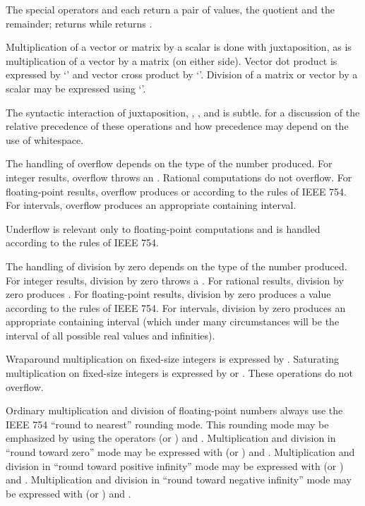 The special operators  and  each return a pair of values,
the quotient and the remainder;  returns
 while
 returns
.

Multiplication of a vector or matrix by a scalar is done with juxtaposition,
as is multiplication of a vector by a matrix (on either side).  Vector dot product
is expressed by `\EXP{\cdot}' and vector cross product by
`\EXP{\times}'.  Division of
a matrix or vector by a scalar may be expressed using `\EXP{/}'.

The syntactic interaction of juxtaposition, \EXP{\cdot}, \EXP{\times},
and \EXP{/} is subtle.
 for a discussion of the relative precedence of
these operations and how precedence may depend on the use of whitespace.

The handling of overflow depends on the type of the number produced.
For integer results, overflow throws an .
Rational computations do not overflow.
For floating-point results, overflow produces \EXP{+\infty} or \EXP{-\infty}
according to the rules of IEEE 754.
For intervals, overflow produces an appropriate containing interval.

Underflow is relevant only to floating-point computations and is handled
according to the rules of IEEE 754.

The handling of division by zero depends on the type of the number produced.
For integer results, division by zero throws a .
For rational results, division by zero produces .
For floating-point results, division by zero produces a  value
according to the rules of IEEE 754.
For intervals, division by zero produces an appropriate containing interval
(which under many circumstances will be the interval of all possible real values and infinities).

Wraparound multiplication on fixed-size integers is expressed by
\EXP{\dottimes}.
Saturating multiplication on fixed-size integers is expressed by
\EXP{\boxdot} or \EXP{\boxtimes}.
These operations do not overflow.

Ordinary multiplication and division of floating-point numbers always
use the IEEE 754 ``round to nearest'' rounding mode.  This rounding
mode may be emphasized by using the operators \EXP{\otimes} (or \EXP{\odot})
and \EXP{\oslash}.  Multiplication and division in ``round toward zero''
mode may be expressed with \EXP{\boxtimes} (or \EXP{\boxdot}) and
\EXP{\boxslash}.
Multiplication and division in ``round toward positive infinity''
mode may be expressed with \EXP{\uptimes} (or \EXP{\updot}) and \EXP{\upslash}.
Multiplication and division in ``round toward negative infinity''
mode may be expressed with \EXP{\downtimes} (or \EXP{\downdot}) and
\EXP{\downslash}.

